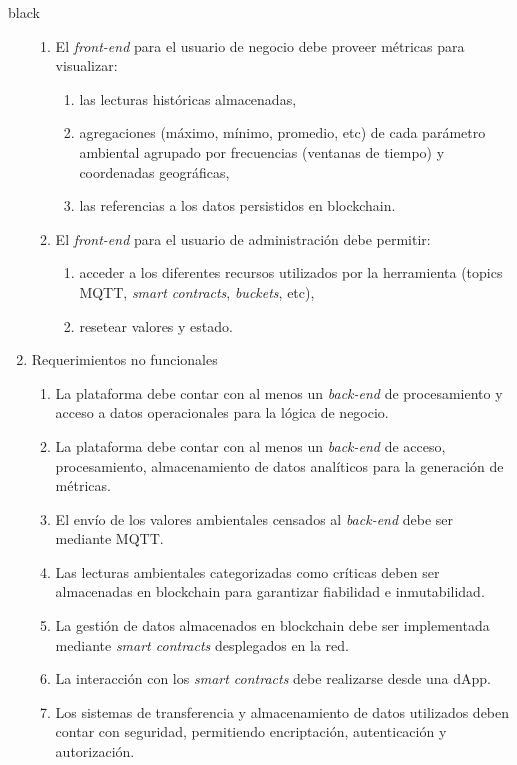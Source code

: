 \documentclass[
11pt, %
]{charter}
\begin{document}
\begin{consigna}{black}
\begin{enumerate}
\begin{enumerate}
		\item El \textit{front-end} para el usuario de negocio debe proveer métricas para visualizar:
			\begin{enumerate}				
				\item las lecturas históricas almacenadas,				
				\item agregaciones (máximo, mínimo, promedio, etc) de cada parámetro ambiental agrupado por frecuencias (ventanas de tiempo) y coordenadas geográficas,				
				\item las referencias a los datos persistidos en blockchain.
			\end{enumerate}			
		\item El \textit{front-end} para el usuario de administración debe permitir:
			\begin{enumerate}				
				\item acceder a los diferentes recursos utilizados por la herramienta (topics MQTT, \textit{smart contracts}, \textit{buckets}, etc),
				\item resetear valores y estado.			
			\end{enumerate}			
		\end{enumerate}	

					
	\item Requerimientos no funcionales		
	\begin{enumerate}	
		\item La plataforma debe contar con al menos un \textit{back-end} de procesamiento y acceso a datos operacionales para la lógica de negocio.
		\item La plataforma debe contar con al menos un \textit{back-end} de acceso, procesamiento, almacenamiento de datos analíticos para la generación de métricas.		
		\item El envío de los valores ambientales censados al \textit{back-end} debe ser mediante MQTT.
		\item Las lecturas ambientales categorizadas como críticas deben ser almacenadas en blockchain para garantizar fiabilidad e inmutabilidad.
		\item La gestión de datos almacenados en blockchain debe ser implementada mediante \textit{smart contracts} desplegados en la red.
		\item La interacción con los \textit{smart contracts} debe realizarse desde una dApp.
		\item Los sistemas de transferencia y almacenamiento de datos utilizados deben contar con seguridad, permitiendo encriptación, autenticación y autorización.	
		\end{enumerate}	
		

\end{enumerate}
\end{consigna}
\end{document}
